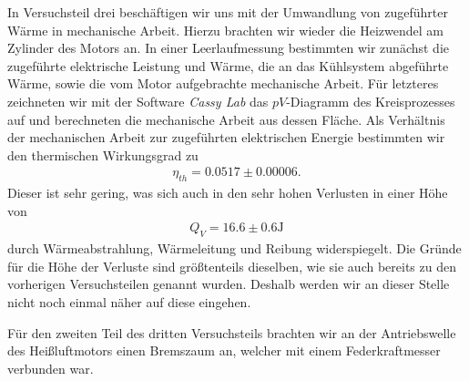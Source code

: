 In Versuchsteil drei beschäftigen wir uns mit der Umwandlung von zugeführter Wärme in mechanische Arbeit. Hierzu brachten wir wieder die Heizwendel am Zylinder des Motors an. In einer Leerlaufmessung bestimmten wir zunächst die zugeführte elektrische Leistung und Wärme, die an das Kühlsystem abgeführte Wärme, sowie die vom Motor aufgebrachte mechanische Arbeit. Für letzteres zeichneten wir mit der Software \textit{Cassy Lab} das $pV$-Diagramm des Kreisprozesses auf und berechneten die mechanische Arbeit aus dessen Fläche. Als Verhältnis der mechanischen Arbeit zur zugeführten elektrischen Energie bestimmten wir den thermischen Wirkungsgrad zu
\begin{align*}
  \eta_{th} = 0.0517 \pm 0.00006.
\end{align*}
Dieser ist sehr gering, was sich auch in den sehr hohen Verlusten in einer Höhe von
\begin{align*}
    Q_V = 16.6 \pm 0.6 \si{\joule}
\end{align*}
durch Wärmeabstrahlung, Wärmeleitung und Reibung widerspiegelt. Die Gründe für die Höhe der Verluste sind größtenteils dieselben, wie sie auch bereits zu den vorherigen Versuchsteilen genannt wurden. Deshalb werden wir an dieser Stelle nicht noch einmal näher auf diese eingehen.

Für den zweiten Teil des dritten Versuchsteils brachten wir an der Antriebswelle des Heißluftmotors einen Bremszaum an, welcher mit einem Federkraftmesser verbunden war. 